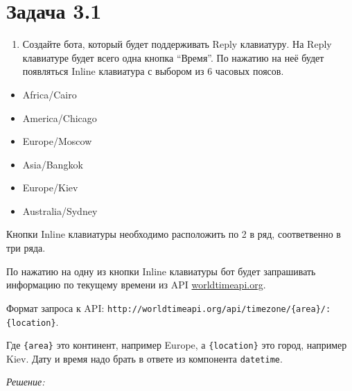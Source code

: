 \documentclass[
]{book}
\providecommand{\tightlist}{%
  \setlength{\itemsep}{0pt}\setlength{\parskip}{0pt}}
\begin{document}
\section*{Задача 3.1}\label{ux437ux430ux434ux430ux447ux430-3.1}

\begin{enumerate}
\def\labelenumi{\arabic{enumi}.}
\tightlist
\item
  Создайте бота, который будет поддерживать Reply клавиатуру. На Reply клавиатуре будет всего одна кнопка ``Время''. По нажатию на неё будет появляться Inline клавиатура с выбором из 6 часовых поясов.
\end{enumerate}

\begin{itemize}
\tightlist
\item
  Africa/Cairo
\item
  America/Chicago
\item
  Europe/Moscow
\item
  Asia/Bangkok
\item
  Europe/Kiev
\item
  Australia/Sydney
\end{itemize}

Кнопки Inline клавиатуры необходимо расположить по 2 в ряд, соответвенно в три ряда.

По нажатию на одну из кнопки Inline клавиатуры бот будет запрашивать информацию по текущему времени из API \href{http://worldtimeapi.org/}{worldtimeapi.org}.

Формат запроса к API: \texttt{http://worldtimeapi.org/api/timezone/\{area\}/:\{location\}}.

Где \texttt{\{area\}} это континент, например Europe, а \texttt{\{location\}} это город, например Kiev. Дату и время надо брать в ответе из компонента \texttt{datetime}.

\emph{Решение:}
\end{document}

